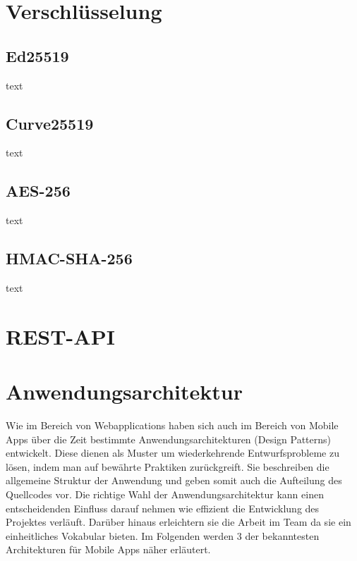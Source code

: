     \section{Verschlüsselung}\label{sec:verschlusselung}

    \subsection{Ed25519}\label{subsec:ed25519}
    text

    \subsection{Curve25519}\label{subsec:curve25519}
    text

    \subsection{AES-256}\label{subsec:aes-256}
    text

    \subsection{HMAC-SHA-256}\label{subsec:hmac-sha-256}
    text

    \section{REST-API}\label{sec:rest}

    \cite{dazer2012restful}

    \newpage
    \section{Anwendungsarchitektur}\label{sec:anwendungsarchitektur}
    Wie im Bereich von Webapplications haben sich auch im Bereich von Mobile Apps über die Zeit bestimmte Anwendungsarchitekturen (Design Patterns) entwickelt.
    Diese dienen als Muster um wiederkehrende Entwurfsprobleme zu lösen, indem man auf bewährte Praktiken zurückgreift.
    Sie beschreiben die allgemeine Struktur der Anwendung und geben somit auch die Aufteilung des Quellcodes vor.
    Die richtige Wahl der Anwendungsarchitektur kann einen entscheidenden Einfluss darauf nehmen wie effizient die Entwicklung des Projektes verläuft.
    Darüber hinaus erleichtern sie die Arbeit im Team da sie ein einheitliches Vokabular bieten.
    Im Folgenden werden 3 der bekanntesten Architekturen für Mobile Apps näher erläutert.

